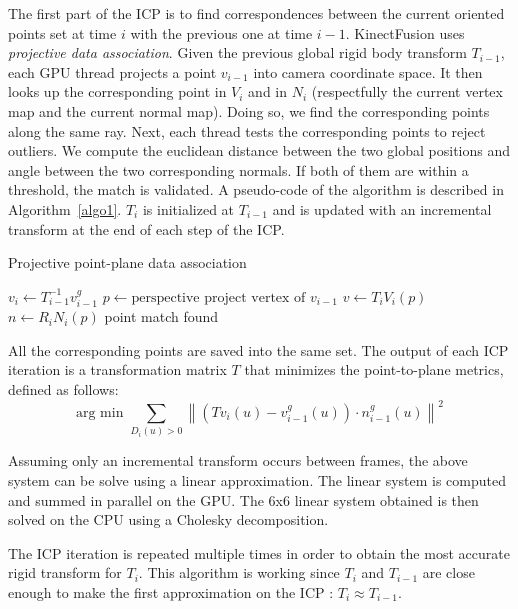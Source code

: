 \documentclass[12pt, twoside]{article}
\begin{document}
The first part of the ICP is to find correspondences between the current oriented points set at time $i$ with the previous one at time $i-1$. KinectFusion uses \textit{projective data association}. Given the previous global rigid body transform $T_{i-1}$, each GPU thread projects a point $v_{i-1}$ into camera coordinate space. It then looks up the corresponding point in $V_i$ and in $N_i$ (respectfully the current vertex map and the current normal map). Doing so, we find the corresponding points along the same ray. Next, each thread tests the corresponding points to reject outliers. We compute the euclidean distance between the two global positions and angle between the two corresponding normals. If both of them are within a threshold, the match is validated. A pseudo-code of the algorithm is described in Algorithm~\ref{algo1}. $T_i$ is initialized at $T_{i-1}$ and is updated with an incremental transform at the end of each step of the ICP.

\begin{algorithm}
\caption{Projective point-plane data association}\label{algo1}
\begin{algorithmic}[1]
  \State $v_i \gets T_{i-1}^{-1}v_{i-1}^g$
  \State $p \gets \text{perspective project vertex of } v_{i-1}$
    \State $v \gets T_iV_i(p)$
    \State $n \gets R_iN_i(p)$
      \State point match found
      \EndIf
    \EndIf
  \EndIf
\EndFor
\end{algorithmic}
\end{algorithm}

All the corresponding points are saved into the same set. The output of each ICP iteration is a transformation matrix $T$ that minimizes the point-to-plane metrics, defined as follows:
$$\text{arg min } \sum_{D_i(u)>0} \left\|(Tv_i(u)-v_{i-1}^g(u))\cdot n_{i-1}^g(u) \right\|^2$$

Assuming only an incremental transform occurs between frames, the above system can be solve using a linear approximation. The linear system is computed and summed in parallel on the GPU. The 6x6 linear system obtained is then solved on the CPU using a Cholesky decomposition.

The ICP iteration is repeated multiple times in order to obtain the most accurate rigid transform for $T_i$. This algorithm is working since $T_i$ and $T_{i-1}$ are close enough to make the first approximation on the ICP : $T_i \approx T_{i-1}$.
\end{document}
